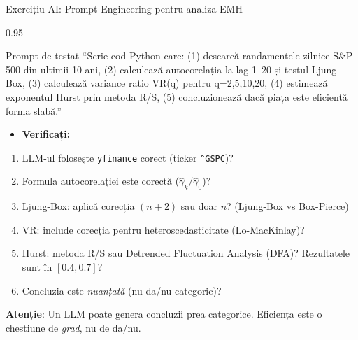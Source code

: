 \documentclass[9pt, aspectratio=169, t]{beamer}
\begin{document}
\begin{frame}{Exercițiu AI: Prompt Engineering pentru analiza EMH}
\begin{cminipage}{0.95\textwidth}
    \vspace{-3mm}
    \begin{block}{\footnotesize Prompt de testat}
        {\footnotesize
        ``Scrie cod Python care: (1) descarcă randamentele zilnice S\&P 500 din ultimii 10 ani, (2) calculează autocorelația la lag 1--20 și testul Ljung-Box, (3) calculează variance ratio VR(q) pentru q=2,5,10,20, (4) estimează exponentul Hurst prin metoda R/S, (5) concluzionează dacă piața este eficientă forma slabă.''
        }
    \end{block}
    \vspace{-2mm}
    {\footnotesize
    \begin{itemize}\setlength{\itemsep}{0pt}
        \item \textbf{Verificați:}
    \end{itemize}
    \begin{enumerate}\setlength{\itemsep}{0pt}
        \item LLM-ul folosește \texttt{yfinance} corect (ticker \texttt{\^{}GSPC})?
        \item Formula autocorelației este corectă ($\hat\gamma_k / \hat\gamma_0$)?
        \item Ljung-Box: aplică corecția $(n+2)$ sau doar $n$? (Ljung-Box vs Box-Pierce)
        \item VR: include corecția pentru heteroscedasticitate (Lo-MacKinlay)?
        \item Hurst: metoda R/S sau Detrended Fluctuation Analysis (DFA)? Rezultatele sunt în $[0.4, 0.7]$?
        \item Concluzia este \textit{nuanțată} (nu da/nu categoric)?
    \end{enumerate}
    }
    \vspace{-2mm}
    \begin{alertblock}{}
        {\footnotesize \textbf{Atenție}: Un LLM poate genera concluzii prea categorice. Eficiența este o chestiune de \textit{grad}, nu de da/nu.}
    \end{alertblock}
\end{cminipage}
\end{frame}
\end{document}
